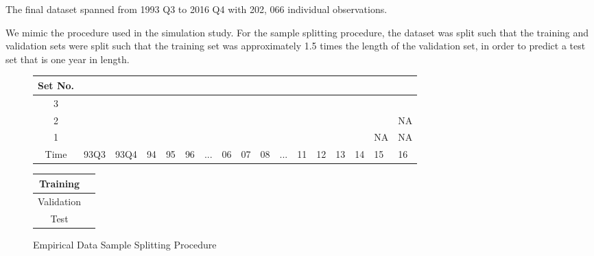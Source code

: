 \documentclass{article}
\begin{document}
The final dataset spanned from 1993 Q3 to 2016 Q4 with 202, 066 individual observations.

We mimic the procedure used in the simulation study. For the sample splitting procedure, the dataset was split such that the training and validation sets were split such that the training set was approximately 1.5 times the length of the validation set, in order to predict a test set that is one year in length.

\begin{figure}[!htb]
	\begin{center}
		\begin{tabular}{|c|p{0.55cm}p{0.55cm}p{0.50cm}p{0.50cm}p{0.50cm}p{0.50cm}p{0.50cm}p{0.50cm}p{0.50cm}p{0.50cm}p{0.50cm}p{0.50cm}p{0.50cm}p{0.50cm}p{0.50cm}p{0.50cm}|}
			\hline
			Set No. &&&&&&&&&&&&&&&& \\
			\hline
			3 & \cellcolor{cyan} & \cellcolor{cyan} & \cellcolor{cyan} & \cellcolor{cyan} & \cellcolor{cyan} & \cellcolor{cyan} & \cellcolor{cyan} & \cellcolor{cyan} &
			\cellcolor{pink} & \cellcolor{pink} & \cellcolor{pink} & \cellcolor{pink} & \cellcolor{pink} & \cellcolor{pink} & \cellcolor{pink} & \cellcolor{olive} \\
			2 & \cellcolor{cyan} & \cellcolor{cyan} & \cellcolor{cyan} & \cellcolor{cyan} & \cellcolor{cyan} & \cellcolor{cyan} & \cellcolor{cyan} &
			\cellcolor{pink} & \cellcolor{pink} & \cellcolor{pink} & \cellcolor{pink} & \cellcolor{pink} & \cellcolor{pink} & \cellcolor{pink} & 	
			\cellcolor{olive} & NA \\
			1 & \cellcolor{cyan} & \cellcolor{cyan} & \cellcolor{cyan} & \cellcolor{cyan} & \cellcolor{cyan} & \cellcolor{cyan} &
			\cellcolor{pink} & \cellcolor{pink} & \cellcolor{pink} & \cellcolor{pink} & \cellcolor{pink} & \cellcolor{pink} & \cellcolor{pink} & \cellcolor{olive} & NA & NA \\
			\hline
			Time & 93Q3 & 93Q4 & 94 & 95 & 96 & ... & 06 & 07 & 08 & ... & 11 & 12 & 13 & 14 & 15 & 16 \\
			\hline
		\end{tabular}
		\medskip
		\begin{tabular}{|c|p{0.60cm}|}
			\hline
			Training & \cellcolor{cyan} \\
			\hline
			Validation & \cellcolor{pink} \\
			\hline
			Test & \cellcolor{olive} \\
			\hline
		\end{tabular}
	\end{center}
	\caption{Empirical Data Sample Splitting Procedure}
	\label{emp_sample_split_diag}
\end{figure}
\end{document}

